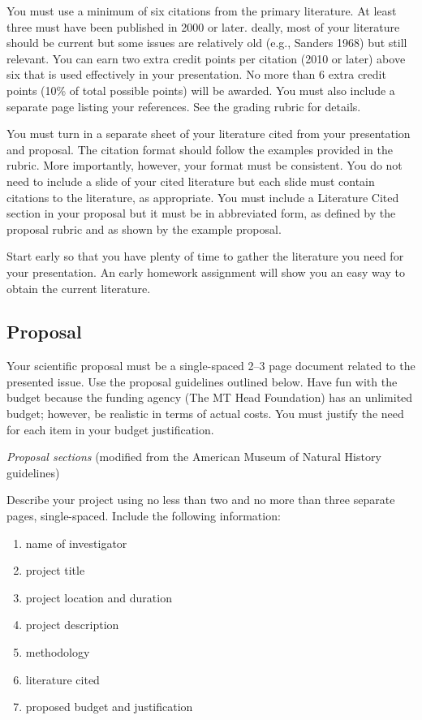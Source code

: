 \documentclass[11pt]{article}
\newcommand{\VSpace}{\vspace{\baselineskip}}
\begin{document}
You must use a minimum of six citations from the primary literature.  At least three must have been published in 2000 or later.  deally, most of your literature should be current but some issues are relatively old (e.g., Sanders 1968) but still relevant.  You can earn two extra credit points per citation (2010 or later) above six that is used effectively in your presentation.  No more than 6 extra credit points (10\% of total possible points) will be awarded.  You must also include a separate page listing your references.  See the grading rubric for details.

You must turn in a separate sheet of your literature cited from your presentation and proposal.  The citation format should follow the examples provided in the rubric. More importantly, however, your format must be consistent.  You do not need to include a slide of your cited literature but each slide must contain citations to the literature, as appropriate. You must include a Literature Cited section in your proposal but it must be in abbreviated form, as defined by the proposal rubric and as shown by the example proposal.

Start early so that you have plenty of time to gather the literature you need for your presentation.  An early homework assignment will show you an easy way to obtain the current literature.

\subsection*{Proposal}

Your scientific proposal must be a single-spaced 2--3 page document related to the presented issue.  Use the proposal guidelines outlined below.  Have fun with the budget because the funding agency (The MT Head Foundation) has an unlimited budget; however, be realistic in terms of actual costs.  You must justify the need for each item in your  budget justification. \VSpace

\noindent\emph{Proposal sections} (modified from the American Museum of Natural History guidelines)\vspace{0.5\baselineskip}

Describe your project using no less than two and no more than three separate pages, single-spaced.  Include the following information: 
\begin{enumerate}
	\item name of investigator 
	\item project title 
	\item project location and duration 
	\item project description
	\item methodology
	\item literature cited 
	\item proposed budget and justification 
\end{enumerate}
	
\end{document}
